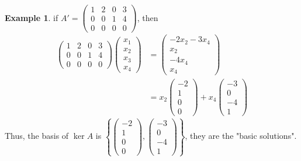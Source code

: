 \documentclass[letterpaper,12pt]{article}
\theoremstyle{definition}
\newtheorem*{example}{Example}
\newcommand{\set}[1]{\left\{ #1 \right\}}
\begin{document}
\begin{example}
if $A' = \begin{pmatrix} 1 & 2 & 0 & 3 \\ 0 & 0 & 1 & 4 \\ 0 & 0 & 0 & 0 \end{pmatrix}$, then
\begin{align*}
    \begin{pmatrix} 1 & 2 & 0 & 3 \\ 0 & 0 & 1 & 4 \\ 0 & 0 & 0 & 0 \end{pmatrix} \begin{pmatrix} x_1 \\ x_2 \\ x_3 \\ x_4 \end{pmatrix} & = \begin{pmatrix} -2x_2 - 3x_4 \\ x_2 \\ -4x_4 \\ x_4 \end{pmatrix} \\
    & = x_2 \begin{pmatrix} -2 \\ 1 \\ 0 \\ 0 \end{pmatrix} + x_4 \begin{pmatrix} -3 \\ 0 \\ -4 \\ 1 \end{pmatrix}
\end{align*}
Thus, the basis of $\ker{A}$ is $\set{\begin{pmatrix} -2 \\ 1 \\ 0 \\ 0 \end{pmatrix}, \begin{pmatrix} -3 \\ 0 \\ -4 \\ 1 \end{pmatrix}}$, they are the "basic solutions".
\end{example}
\end{document}

